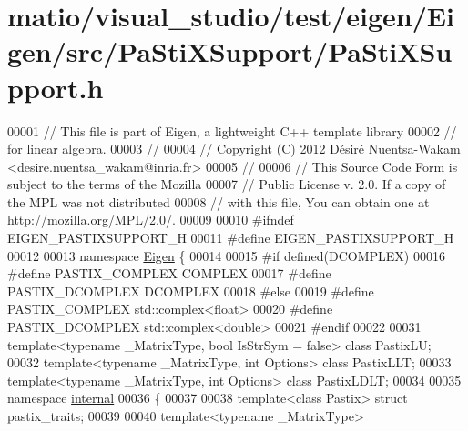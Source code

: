 \hypertarget{matio_2visual__studio_2test_2eigen_2_eigen_2src_2_pa_sti_x_support_2_pa_sti_x_support_8h_source}{}\section{matio/visual\+\_\+studio/test/eigen/\+Eigen/src/\+Pa\+Sti\+X\+Support/\+Pa\+Sti\+X\+Support.h}
\label{matio_2visual__studio_2test_2eigen_2_eigen_2src_2_pa_sti_x_support_2_pa_sti_x_support_8h_source}

\begin{DoxyCode}
00001 \textcolor{comment}{// This file is part of Eigen, a lightweight C++ template library}
00002 \textcolor{comment}{// for linear algebra.}
00003 \textcolor{comment}{//}
00004 \textcolor{comment}{// Copyright (C) 2012 Désiré Nuentsa-Wakam <desire.nuentsa\_wakam@inria.fr>}
00005 \textcolor{comment}{//}
00006 \textcolor{comment}{// This Source Code Form is subject to the terms of the Mozilla}
00007 \textcolor{comment}{// Public License v. 2.0. If a copy of the MPL was not distributed}
00008 \textcolor{comment}{// with this file, You can obtain one at http://mozilla.org/MPL/2.0/.}
00009 
00010 \textcolor{preprocessor}{#ifndef EIGEN\_PASTIXSUPPORT\_H}
00011 \textcolor{preprocessor}{#define EIGEN\_PASTIXSUPPORT\_H}
00012 
00013 \textcolor{keyword}{namespace }\hyperlink{namespace_eigen}{Eigen} \{ 
00014 
00015 \textcolor{preprocessor}{#if defined(DCOMPLEX)}
00016 \textcolor{preprocessor}{  #define PASTIX\_COMPLEX  COMPLEX}
00017 \textcolor{preprocessor}{  #define PASTIX\_DCOMPLEX DCOMPLEX}
00018 \textcolor{preprocessor}{#else}
00019 \textcolor{preprocessor}{  #define PASTIX\_COMPLEX  std::complex<float>}
00020 \textcolor{preprocessor}{  #define PASTIX\_DCOMPLEX std::complex<double>}
00021 \textcolor{preprocessor}{#endif}
00022 
00031 \textcolor{keyword}{template}<\textcolor{keyword}{typename} \_MatrixType, \textcolor{keywordtype}{bool} IsStrSym = false> \textcolor{keyword}{class }PastixLU;
00032 \textcolor{keyword}{template}<\textcolor{keyword}{typename} \_MatrixType, \textcolor{keywordtype}{int} Options> \textcolor{keyword}{class }PastixLLT;
00033 \textcolor{keyword}{template}<\textcolor{keyword}{typename} \_MatrixType, \textcolor{keywordtype}{int} Options> \textcolor{keyword}{class }PastixLDLT;
00034 
00035 \textcolor{keyword}{namespace }\hyperlink{namespaceinternal}{internal}
00036 \{
00037     
00038   \textcolor{keyword}{template}<\textcolor{keyword}{class} Pastix> \textcolor{keyword}{struct }pastix\_traits;
00039 
00040   \textcolor{keyword}{template}<\textcolor{keyword}{typename} \_MatrixType>

\end{DoxyCode}
